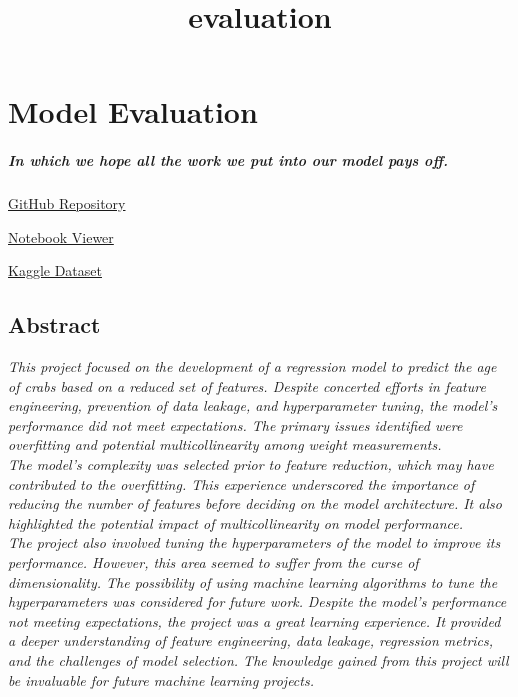 \documentclass[11pt]{article}
\title{evaluation}
\begin{document}
    
    \maketitle
    
    

    
    \section{Model Evaluation}\label{model-evaluation}

\subparagraph{\texorpdfstring{\emph{In which we hope all the work we put
into our model pays
off.}}{In which we hope all the work we put into our model pays off.}}\label{in-which-we-hope-all-the-work-we-put-into-our-model-pays-off.}

\href{https://github.com/ahester57/ai_workshop/tree/master/notebooks/time_for_crab/3-evaluation}{GitHub
Repository}

\href{https://nbviewer.jupyter.org/github/ahester57/ai_workshop/blob/master/notebooks/time_for_crab/3-evaluation/evaluation.ipynb}{Notebook
Viewer}

\href{https://www.kaggle.com/sidhus/crab-age-prediction}{Kaggle Dataset}

    \subsection{Abstract}\label{abstract}

\emph{This project focused on the development of a regression model to
predict the age of crabs based on a reduced set of features. Despite
concerted efforts in feature engineering, prevention of data leakage,
and hyperparameter tuning, the model's performance did not meet
expectations. The primary issues identified were overfitting and
potential multicollinearity among weight measurements.}\\
\emph{The model's complexity was selected prior to feature reduction,
which may have contributed to the overfitting. This experience
underscored the importance of reducing the number of features before
deciding on the model architecture. It also highlighted the potential
impact of multicollinearity on model performance.}\\
\emph{The project also involved tuning the hyperparameters of the model
to improve its performance. However, this area seemed to suffer from the
curse of dimensionality. The possibility of using machine learning
algorithms to tune the hyperparameters was considered for future work.}
\emph{Despite the model's performance not meeting expectations, the
project was a great learning experience. It provided a deeper
understanding of feature engineering, data leakage, regression metrics,
and the challenges of model selection. The knowledge gained from this
project will be invaluable for future machine learning projects.}
\end{document}
